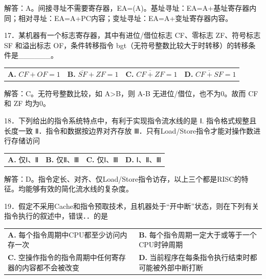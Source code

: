 \documentclass[UTF8,11pt]{ctexart}
\begin{document}
解答：A。间接寻址不需要寄存器，EA=(A)。基址寻址：EA=A+基址寄存器内同；相对寻址：EA=A+PC内容；变址寻址：EA=A+变址寄存器内容。


17．某机器有一个标志寄存器，其中有进位/借位标志 CF、零标志 ZF、符号标志 SF 和溢出标志 OF，条件转移指令 bgt（无符号整数比较大于时转移）的转移条件是\_\_\_\_\_\_。


\begin{center}\begin{tabular}{>{\raggedright\arraybackslash}p{\dimexpr(\linewidth-8\tabcolsep)/4\relax}>{\raggedright\arraybackslash}p{\dimexpr(\linewidth-8\tabcolsep)/4\relax}>{\raggedright\arraybackslash}p{\dimexpr(\linewidth-8\tabcolsep)/4\relax}>{\raggedright\arraybackslash}p{\dimexpr(\linewidth-8\tabcolsep)/4\relax}}
\textbf{A.} \(\displaystyle CF+OF=1\) & \textbf{B.} \(\displaystyle \overline{SF}+ZF=1\) & \textbf{C.} \(\displaystyle \overline{CF+ZF}=1\) & \textbf{D.} \(\displaystyle \overline{CF+SF}=1\)\\[.35em]\end{tabular}\end{center}

解答：C。无符号整数比较，如 A>B，则 A-B 无进位/借位，也不为0。故而 CF 和 ZF 均为0。


18．下列给出的指令系统特点中，有利于实现指令流水线的是 Ⅰ. 指令格式规整且长度一致 Ⅱ．指令和数据按边界对齐存放 Ⅲ．只有Load/Store指令才能对操作数进行存储访问


\begin{center}\begin{tabular}{>{\raggedright\arraybackslash}p{\dimexpr(\linewidth-8\tabcolsep)/4\relax}>{\raggedright\arraybackslash}p{\dimexpr(\linewidth-8\tabcolsep)/4\relax}>{\raggedright\arraybackslash}p{\dimexpr(\linewidth-8\tabcolsep)/4\relax}>{\raggedright\arraybackslash}p{\dimexpr(\linewidth-8\tabcolsep)/4\relax}}
\textbf{A.} 仅Ⅰ、Ⅱ & \textbf{B.} 仅Ⅱ、Ⅲ & \textbf{C.} 仅Ⅰ、Ⅲ & \textbf{D.} Ⅰ、Ⅱ、Ⅲ\\[.35em]\end{tabular}\end{center}

解答：D。指令定长、对齐、仅Load/Store指令访存，以上三个都是RISC的特征。均能够有效的简化流水线的复杂度。


19．假定不采用Cache和指令预取技术，且机器处于“开中断”状态，则在下列有关指令执行的叙述中，错误．．的是


\begin{center}\begin{tabular}{>{\raggedright\arraybackslash}p{\dimexpr(\linewidth-4\tabcolsep)/2\relax}>{\raggedright\arraybackslash}p{\dimexpr(\linewidth-4\tabcolsep)/2\relax}}
\textbf{A.} 每个指令周期中CPU都至少访问内存一次 & \textbf{B.} 每个指令周期一定大于或等于一个CPU时钟周期\\[.35em]
\textbf{C.} 空操作指令的指令周期中任何寄存器的内容都不会被改变 & \textbf{D.} 当前程序在每条指令执行结束时都可能被外部中断打断\\[.35em]\end{tabular}\end{center}
\end{document}
